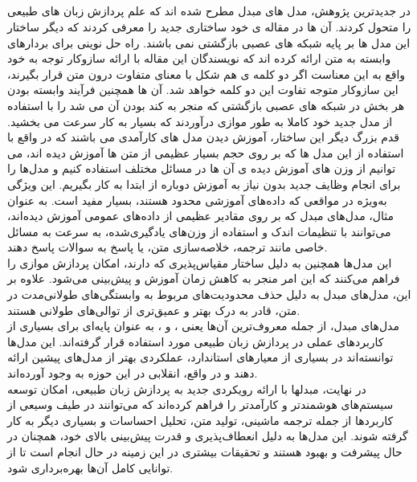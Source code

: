\subsection{}
در جدیدترین پژوهش، مدل های مبدل مطرح شده اند که علم پردازش زبان های طبیعی را متحول کردند. آن ها در
مقاله ی خود ساختاری جدید را معرفی کردند که دیگر ساختار این مدل ها بر پایه شبکه های عصبی بازگشتی نمی باشند.
راه حل نوینی برای بردارهای وابسته به متن ارائه کرده اند که
نویسندگان این مقاله با ارائه سازوکار توجه به خود
واقع به این معناست اگر دو کلمه ی هم شکل با معنای متفاوت درون متن قرار بگیرند، این سازوکار متوجه تفاوت این دو کلمه
خواهد شد. آن ها همچنین فرآیند وابسته بودن هر بخش در شبکه های عصبی بازگشتی که منجر به کند بودن آن می شد را
با استفاده از مدل جدید خود کاملا به طور موازی درآوردند که بسیار به کار سرعت می بخشید.
قدم بزرگ دیگر این ساختار، آموزش دیدن مدل های کارآمدی می باشند که در واقع با استفاده
از این مدل ها که بر روی حجم بسیار عظیمی از متن ها آموزش دیده اند، می توانیم از وزن های آموزش دیده ی آن ها در مسائل مختلف استفاده کنیم و مدل‌ها را برای انجام وظایف جدید بدون نیاز به آموزش دوباره از ابتدا به کار بگیریم. این ویژگی به‌ویژه در مواقعی که داده‌های آموزشی محدود هستند، بسیار مفید است. به عنوان مثال، مدل‌های مبدل که بر روی مقادیر عظیمی از داده‌های عمومی آموزش دیده‌اند، می‌توانند با تنظیمات اندک و استفاده از وزن‌های یادگیری‌شده، به سرعت به مسائل خاصی مانند ترجمه، خلاصه‌سازی متن، یا پاسخ به سوالات پاسخ دهند.
\\
این مدل‌ها همچنین به دلیل ساختار مقیاس‌پذیری که دارند، امکان پردازش موازی را فراهم می‌کنند که این امر منجر به کاهش زمان آموزش و پیش‌بینی می‌شود. علاوه بر این، مدل‌های مبدل به دلیل حذف محدودیت‌های مربوط به وابستگی‌های طولانی‌مدت در متن، قادر به درک بهتر و عمیق‌تری از توالی‌های طولانی هستند.
\\
مدل‌های مبدل، از جمله معروف‌ترین آن‌ها یعنی ،  و ، به عنوان پایه‌ای برای بسیاری از کاربردهای عملی در پردازش زبان طبیعی مورد استفاده قرار گرفته‌اند. این مدل‌ها توانسته‌اند در بسیاری از معیارهای استاندارد، عملکردی بهتر از مدل‌های پیشین ارائه دهند و در واقع، انقلابی در این حوزه به وجود آورده‌اند.
\\
در نهایت، مبدلها با ارائه رویکردی جدید به پردازش زبان طبیعی، امکان توسعه سیستم‌های هوشمندتر و کارآمدتر را فراهم کرده‌اند که می‌توانند در طیف وسیعی از کاربردها از جمله ترجمه ماشینی، تولید متن، تحلیل احساسات و بسیاری دیگر به کار گرفته شوند. این مدل‌ها به دلیل انعطاف‌پذیری و قدرت پیش‌بینی بالای خود، همچنان در حال پیشرفت و بهبود هستند و تحقیقات بیشتری در این زمینه در حال انجام است تا از توانایی کامل آن‌ها بهره‌برداری شود.


